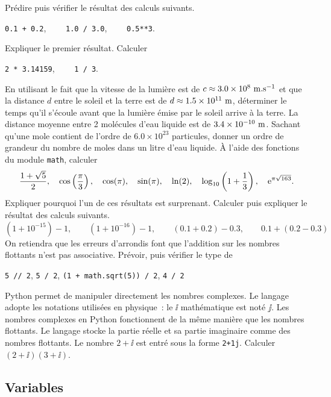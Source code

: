 \documentclass{magnolia}
\begin{document}
\begin{questions}
\question Prédire puis vérifier le résultat des calculs suivants.
  \begin{center}
  \verb_0.1 + 0.2_, $\qquad$\verb_1.0 / 3.0_, $\qquad$\verb_0.5**3_.
  \end{center}
  Expliquer le premier résultat.
\question Calculer
  \begin{center}
  \verb_2 * 3.14159_, $\qquad$\verb_1 / 3_.
  \end{center}
\question En utilisant le fait que la vitesse de la lumière est de $c \approx 3.0\times 10^{8}\ {\rm m}.{\rm s}^{-1}$ et que la distance $d$ entre le soleil et la terre est de $d \approx 1.5\times 10^{11}\ {\rm m}$, déterminer le temps qu'il s'écoule avant que la lumière émise par le soleil arrive à la terre.
\question La distance moyenne entre 2 molécules d'eau liquide est de $3.4\times 10^{-10}\ {\rm m}$. Sachant qu'une mole contient de l'ordre de $6.0\times 10^{23}$ particules, donner un ordre de grandeur du nombre de moles dans un litre d'eau liquide.
\question À l'aide des fonctions du module \verb!math!, calculer
  \[\frac{1+\sqrt{5}}{2}, \quad \cos\left(\frac{\pi}{3}\right), \quad \cos(\pi), \quad \sin(\pi), \quad\ln(2), \quad \log_{10}\left(1+\frac{1}{3}\right),\quad {\rm e}^{\pi\sqrt{163}}.\]
  Expliquer pourquoi l'un de ces résultats est surprenant.
\question Calculer puis expliquer le résultat des calculs suivants.
  \[(1 + 10^{-15}) - 1, \qquad (1 + 10^{-16}) - 1, \qquad (0.1 + 0.2) - 0.3, \qquad 0.1 + (0.2 - 0.3)\]
  On retiendra que les erreurs d'arrondis font que l'addition sur les nombres flottants n'est pas associative.
\question Prévoir, puis vérifier le type de
  \begin{center}
  \verb_5 // 2_, \quad \verb_5 / 2_, \quad \verb_(1 + math.sqrt(5)) / 2_, \quad \verb_4 / 2_
  \end{center}
\enonce Python permet de manipuler directement les nombres complexes. Le langage adopte les notations utilisées en physique~: le $\ii$ mathématique est noté $\jj$. Les nombres complexes en Python fonctionnent de la même manière que les nombres flottants. Le langage stocke la partie réelle et sa partie imaginaire comme des nombres flottants. Le nombre $2+\ii$ est entré sous la forme \verb_2+1j_.
\question Calculer $(2+\ii)(3+\ii)$.
\end{questions}

\subsection{Variables}
\end{document}
